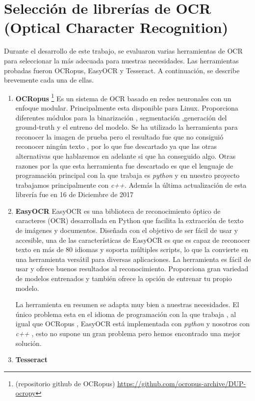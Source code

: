\section{Selección de librerías de OCR (Optical Character Recognition)}
Durante el desarrollo de este trabajo, se evaluaron varias herramientas de OCR para seleccionar la más adecuada para nuestras necesidades. Las herramientas probadas fueron OCRopus, EasyOCR y Tesseract. A continuación, se describe brevemente cada una de ellas.
\begin{enumerate}
	\item \textbf{OCRopus}
	\footnote{(repositorio github de OCRopus) \url{https://github.com/ocropus-archive/DUP-ocropy} }
	Es un sistema de OCR basado en redes neuronales con un enfoque modular.
	Principalmente esta disponible para Linux. Proporciona diferentes módulos para la binarización , segmentación ,generación del ground-truth y el entreno del modelo.
	Se ha utilizado la herramienta para reconocer la imagen de prueba pero el resultado fue que no consiguió reconocer ningún texto , por lo que fue descartado ya que las otras alternativas que hablaremos en adelante si que ha conseguido algo.
	Otras razones por la que esta herramienta fue descartado es que el lenguaje de programación principal con la que trabaja es \emph{python} y en nuestro proyecto trabajamos principalmente con \emph{c++}. Además la última actualización de esta librería fue en 16 de Diciembre de 2017
	
	\item \textbf{EasyOCR}
	EasyOCR es una biblioteca de reconocimiento óptico de caracteres (OCR) desarrollada en Python que facilita la extracción de texto de imágenes y documentos. Diseñada con el objetivo de ser fácil de usar y accesible, una de las características de EasyOCR es que es capaz de reconocer texto en más de 80 idiomas y soporta múltiples scripts, lo que la convierte en una herramienta versátil para diversas aplicaciones.
	La herramienta es fácil de usar y ofrece buenos resultados al reconocimiento.
	Proporciona gran variedad de modelos entrenados y también ofrece la opción de entrenar tu propio modelo.
	
	La herramienta en resumen se adapta muy bien a nuestras necesidades. El único problema esta en el idioma de programación con la que trabaja , al igual que OCRopus , EasyOCR está implementada con \emph{python} y nosotros con \emph{c++} , esto no supone un gran problema pero hemos encontrado una mejor solución.
	
	\item \textbf{Tesseract}
	

\end{enumerate}
